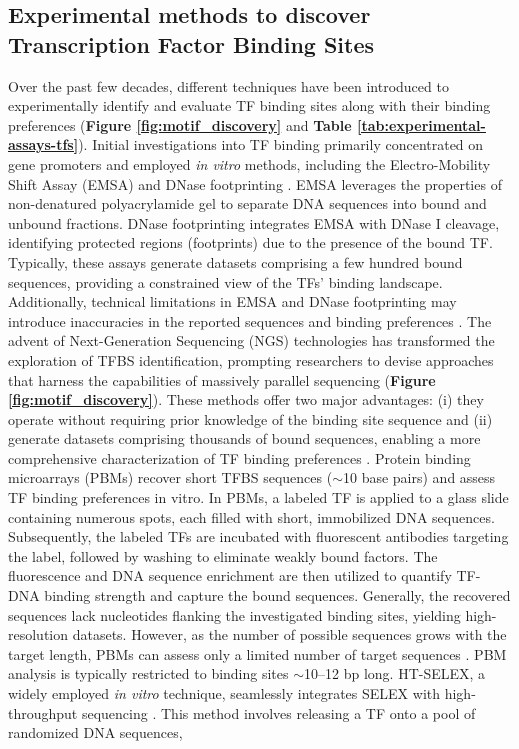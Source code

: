 \documentclass[a4paper, titlepage, openright]{book}
\begin{document}
\subsection{Experimental methods to discover Transcription Factor Binding Sites}\label{subsection:experimental-methods}
Over the past few decades, different techniques have been introduced to experimentally identify and evaluate TF binding sites along with their binding preferences \citep{jolma2011methods} (\textbf{Figure \ref{fig:motif_discovery}} and \textbf{Table \ref{tab:experimental-assays-tfs}}). Initial investigations into TF binding primarily concentrated on gene promoters \citep{stormo2000dna} and employed \emph{in vitro} methods, including the Electro-Mobility Shift Assay (EMSA) \citep{garner1981gel} and DNase footprinting \citep{galas1978dnaase}. EMSA leverages the properties of non-denatured polyacrylamide gel to separate DNA sequences into bound and unbound fractions. DNase footprinting integrates EMSA with DNase I cleavage, identifying protected regions (footprints) due to the presence of the bound TF. Typically, these assays generate datasets comprising a few hundred bound sequences, providing a constrained view of the TFs' binding landscape. Additionally, technical limitations in EMSA and DNase footprinting may introduce inaccuracies in the reported sequences and binding preferences \citep{jolma2011methods}. The advent of Next-Generation Sequencing (NGS) technologies has transformed the exploration of TFBS identification, prompting researchers to devise approaches that harness the capabilities of massively parallel sequencing (\textbf{Figure \ref{fig:motif_discovery}}). These methods offer two major advantages: (i) they operate without requiring prior knowledge of the binding site sequence \citep{jolma2011methods, zia2012towards} and (ii) generate datasets comprising thousands of bound sequences, enabling a more comprehensive characterization of TF binding preferences \citep{stormo2010determining}. Protein binding microarrays (PBMs) \citep{berger2006compact,berger2009universal} recover short TFBS sequences ($\sim$10 base pairs) and assess TF binding preferences in vitro. In PBMs, a labeled TF is applied to a glass slide containing numerous spots, each filled with short, immobilized DNA sequences. Subsequently, the labeled TFs are incubated with fluorescent antibodies targeting the label, followed by washing to eliminate weakly bound factors. The fluorescence and DNA sequence enrichment are then utilized to quantify TF-DNA binding strength and capture the bound sequences. Generally, the recovered sequences lack nucleotides flanking the investigated binding sites, yielding high-resolution datasets. However, as the number of possible sequences grows with the target length, PBMs can assess only a limited number of target sequences \citep{jolma2011methods, zia2012towards}. PBM analysis is typically restricted to binding sites $\sim$10–12 bp long. HT-SELEX, a widely employed \emph{in vitro} technique, seamlessly integrates SELEX with high-throughput sequencing \citep{jolma2011methods,jolma2010multiplexed}. This method involves releasing a TF onto a pool of randomized DNA sequences, 
\end{document}
